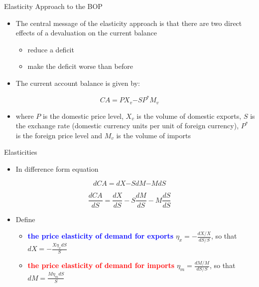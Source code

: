 \documentclass[10pt,hyperref={CJKbookmarks=true},xcolor=dvipsnames,aspectratio=169]{beamer}
\begin{document}
\begin{frame}{Elasticity Approach to the BOP}

\begin{itemize}
\item The central message of the elasticity approach is that there are two
direct effects of a devaluation on the current balance

\begin{itemize}
\item reduce a deficit
\item make the deficit worse than before
\end{itemize}
\item The current account balance is given by:
\end{itemize}

\[
CA=PX_{v}\text{−}SP^{*}M_{v}
\]

\begin{itemize}
\item where $P$ is the domestic price level, $X_{v}$ is the volume of
domestic exports, $S$ is the exchange rate (domestic currency units
per unit of foreign currency), $P^{*}$ is the foreign price level
and $M_{v}$ is the volume of imports
\end{itemize}
\end{frame}

\begin{frame}{Elasticities}

\begin{itemize}
\item In difference form equation
\end{itemize}

\[
dCA=dX\text{−}SdM\text{−}MdS
\]


\[
\frac{dCA}{dS}=\frac{dX}{dS}-S\frac{dM}{dS}-M\frac{dS}{dS}
\]

\begin{itemize}
\item Define

\begin{itemize}
\item \textbf{\textcolor{blue}{the price elasticity of demand for exports}}
$\eta_{x}=-\frac{dX/X}{dS/S}$, so that \textrm{$dX=-\frac{X\eta_{x}dS}{S}$}

\item \textbf{\textcolor{red}{the price elasticity of demand for imports}}
$\eta_{m}=\frac{dM/M}{dS/S}$, so that \textrm{$dM=\frac{M\eta_{m}dS}{S}$}
\end{itemize}
\end{itemize}
\end{frame}
\end{document}
